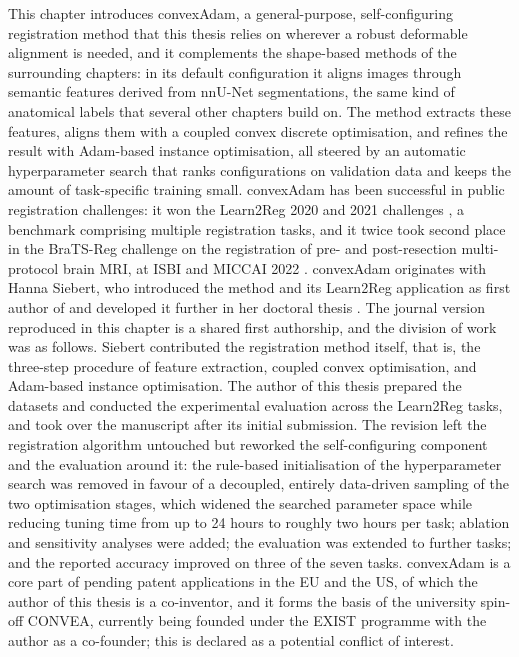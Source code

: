 This chapter introduces convexAdam, a general-purpose, self-configuring registration method that this thesis relies on wherever a robust deformable alignment is needed, and it complements the shape-based methods of the surrounding chapters: in its default configuration it aligns images through semantic features derived from nnU-Net segmentations, the same kind of anatomical labels that several other chapters build on. The method extracts these features, aligns them with a coupled convex discrete optimisation, and refines the result with Adam-based instance optimisation, all steered by an automatic hyperparameter search that ranks configurations on validation data and keeps the amount of task-specific training small. convexAdam has been successful in public registration challenges: it won the Learn2Reg 2020 and 2021 challenges \citep{siebert2021fast, hering2022learn2reg}, a benchmark comprising multiple registration tasks, and it twice took second place in the BraTS-Reg challenge on the registration of pre- and post-resection multi-protocol brain MRI, at ISBI and MICCAI 2022 \citep{grossbrohmer2022employing}. convexAdam originates with Hanna Siebert, who introduced the method and its Learn2Reg application as first author of \citep{siebert2021fast} and developed it further in her doctoral thesis \citep{siebert2024thesis}. 
The journal version reproduced in this chapter \citep{siebert2024convexadam} is a shared first authorship, and the division of work was as follows. Siebert contributed the registration method itself, that is, the three-step procedure of feature extraction, coupled convex optimisation, and Adam-based instance optimisation. The author of this thesis prepared the datasets and conducted the experimental evaluation across the Learn2Reg tasks, and took over the manuscript after its initial submission. The revision left the registration algorithm untouched but reworked the self-configuring component and the evaluation around it: the rule-based initialisation of the hyperparameter search was removed in favour of a decoupled, entirely data-driven sampling of the two optimisation stages, which widened the searched parameter space while reducing tuning time from up to 24 hours to roughly two hours per task; ablation and sensitivity analyses were added; the evaluation was extended to further tasks; and the reported accuracy improved on three of the seven tasks. convexAdam is a core part of pending patent applications in the EU and the US, of which the author of this thesis is a co-inventor, and it forms the basis of the university spin-off CONVEA, currently being founded under the EXIST programme with the author as a co-founder; this is declared as a potential conflict of interest.

